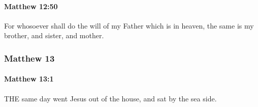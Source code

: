 		\paragraph{Matthew 12:50} %
			\label{MATTHEW-12-50}

			For whosoever shall do the will of my Father which is in heaven, the same is my brother, and sister, and mother.

			\begin{framed}
			\scriptsize
				\begin{compactdesc}
					\item[SBLG] 
				\end{compactdesc}
			\end{framed}

	\subsubsection{Matthew 13} %
		\label{MATTHEW-13}
		
		\paragraph{Matthew 13:1} %
			\label{MATTHEW-13-1}

			THE same day went Jesus out of the house, and sat by the sea side.

